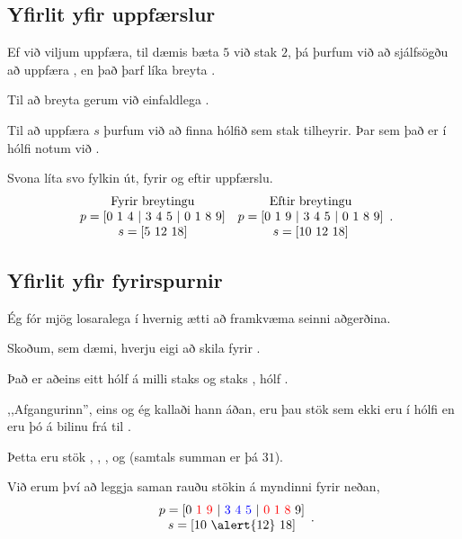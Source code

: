 \subsection{Yfirlit yfir uppfærslur}
{
    {
        \item<1-> Ef við viljum uppfæra, til dæmis bæta $5$ við stak $2$, þá þurfum við að sjálfsögðu að uppfæra
            , en það þarf líka breyta .
        \item<2-> Til að breyta  gerum við einfaldlega .
        \item<3-> Til að uppfæra $s$ þurfum við að finna hólfið sem stak  tilheyrir. Þar sem það er í hólfi 
            notum við .
        \item<4-> Svona líta svo fylkin út, fyrir og eftir uppfærslu.
            \[
            \begin {array}{c c}
            \text{Fyrir breytingu} & \text{Eftir breytingu}\\
                p = [0\ 1\ 4\ |\ 3\ 4\ 5\ |\ 0\ 1\ 8\ 9] & p = [0\ 1\ 9\ |\ 3\ 4\ 5\ |\ 0\ 1\ 8\ 9]\\
                s = [5\ 12\ 18] & s = [10\ 12\ 18]
            \end {array}.
            \]
    }
}

\subsection{Yfirlit yfir fyrirspurnir}
{
    {
        \item<1-> Ég fór mjög losaralega í hvernig ætti að framkvæma seinni aðgerðina.
        \item<2-> Skoðum, sem dæmi, hverju eigi að skila fyrir .
        \item<3-> Það er aðeins eitt hólf á milli staks  og staks , hólf .
        \item<4-> ,,Afgangurinn'', eins og ég kallaði hann áðan, eru þau stök sem ekki eru í hólfi 
            en eru þó á bilinu frá  til .
        \item<5-> Þetta eru stök , , ,  og  (samtals summan er þá $31$).
        \item<6-> Við erum því að leggja saman rauðu stökin á myndinni fyrir neðan,
            \[
            \begin {array}{c}
                p = [0\ {\color{red} 1 \ 9\ }|\ {\color{blue}3\ 4\ 5\ } |\ {\color{red} 0\ 1\ 8\ } 9]\\ 
                s = [10\ \alert{12}\ 18]
        \end {array}.
            \]
    }
}

